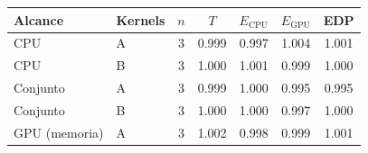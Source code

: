\begin{tabular}{@{}llccccc@{}}
\toprule
\textbf{Alcance} & \textbf{Kernels} & \textbf{$n$} & \textbf{$T$} & \textbf{$E_{\mathrm{CPU}}$} & \textbf{$E_{\mathrm{GPU}}$} & \textbf{EDP} \\
\midrule
CPU & A & 3 & 0.999 & 0.997 & 1.004 & 1.001 \\
CPU & B & 3 & 1.000 & 1.001 & 0.999 & 1.000 \\
Conjunto & A & 3 & 0.999 & 1.000 & 0.995 & 0.995 \\
Conjunto & B & 3 & 1.000 & 1.000 & 0.997 & 1.000 \\
GPU (memoria) & A & 3 & 1.002 & 0.998 & 0.999 & 1.001 \\
\bottomrule
\end{tabular}
